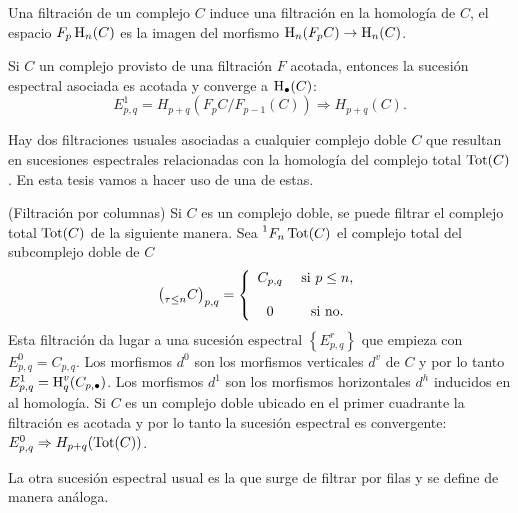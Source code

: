 \documentclass[a4paper,oneside,fleqn,11pt,../tesis.tex]{subfiles}
\begin{document}
Una filtración de un complejo $C$ induce una filtración en la homología de $C$, el espacio $F_p \operatorname{H}_{n}(C)$ es la imagen
del morfismo $\operatorname{H}_{n}(F_p C) \to \operatorname{H}_{n}(C)$.

\begin{Teorema}
    Si $C$ un complejo provisto de una filtración $F$ acotada, entonces la sucesión espectral asociada es acotada y converge a $\operatorname{H}_{\bullet}(C)$:
    \[
        E_{p, q}^{1} = H_{p + q}(F_p C / F_{p - 1}(C)) \Rightarrow H_{p + q}(C).
    \]
\end{Teorema}

Hay dos filtraciones usuales asociadas a cualquier complejo doble $C$ que resultan en sucesiones espectrales relacionadas con la homología
del complejo total $\operatorname{Tot}(C)$. En esta tesis vamos a hacer uso de una de estas.

\begin{definition} (Filtración por columnas) Si $C$ es un complejo doble, se puede filtrar el complejo total $\operatorname{Tot}(C)$ de la siguiente manera. Sea $\prescript{1}{}{F_{n}}\operatorname{Tot}(C)$ el complejo total del subcomplejo doble de $C$
\[
	\left(\prescript{}{\tau \leq n}{C}\right)_{p, q} = \left\{\begin{array}{cc}
    C_{p, q} &\text{ si } p \leq n,\\
    &\\
    0 & \text{ si no}. \\
	\end{array}\right.
\]
Esta filtración da lugar a una sucesión espectral $\left\lbrace E_{p, q}^{r}\right\rbrace$ que empieza con $E_{p, q}^{0} = C_{p, q}$. Los morfismos
$d^{0}$ son los morfismos verticales $d^{v}$ de $C$ y por lo tanto $E^{1}_{p, q} = \operatorname{H}_{q}^{v}(C_{p, \bullet})$. Los morfismos $d^{1}$
son los morfismos horizontales $d^{h}$ inducidos en al homología. Si $C$ es un complejo doble ubicado en el primer cuadrante
la filtración es acotada y por lo tanto la sucesión espectral es convergente: $E_{p, q}^{0} \Rightarrow H_{p + q}(\operatorname{Tot}(C))$. 
\end{definition}

La otra sucesión espectral usual es la que surge de filtrar por filas y se define de manera análoga. 
\end{document}
